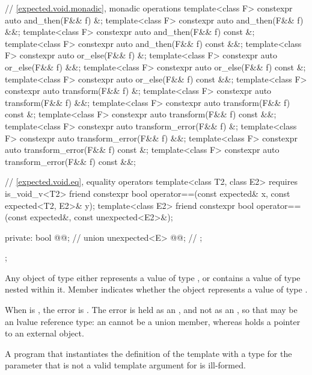 \begin{codeblock}
{  // \ref{expected.void.monadic}, monadic operations
  template<class F> constexpr auto and_then(F&& f) &;
  template<class F> constexpr auto and_then(F&& f) &&;
  template<class F> constexpr auto and_then(F&& f) const &;
  template<class F> constexpr auto and_then(F&& f) const &&;
  template<class F> constexpr auto or_else(F&& f) &;
  template<class F> constexpr auto or_else(F&& f) &&;
  template<class F> constexpr auto or_else(F&& f) const &;
  template<class F> constexpr auto or_else(F&& f) const &&;
  template<class F> constexpr auto transform(F&& f) &;
  template<class F> constexpr auto transform(F&& f) &&;
  template<class F> constexpr auto transform(F&& f) const &;
  template<class F> constexpr auto transform(F&& f) const &&;
  template<class F> constexpr auto transform_error(F&& f) &;
  template<class F> constexpr auto transform_error(F&& f) &&;
  template<class F> constexpr auto transform_error(F&& f) const &;
  template<class F> constexpr auto transform_error(F&& f) const &&;

  // \ref{expected.void.eq}, equality operators
  template<class T2, class E2> requires is_void_v<T2>
    friend constexpr bool operator==(const expected& x, const expected<T2, E2>& y);
  template<class E2>
    friend constexpr bool operator==(const expected&, const unexpected<E2>&);

private:
  bool @@;         // \expos
  union {
    unexpected<E> @@; // \expos
  };
};
\end{codeblock}

\pnum
Any object of type  either
represents a value of type , or
contains a value of type 
nested within it.
Member  indicates whether the  object
represents a value of type .

\begin{addedblock}
\pnum
When  is , the error is
. The error is held as an ,
and not as an , so that  may be an lvalue reference type: an
 cannot be a union member, whereas  holds a
pointer to an external object.
\end{addedblock}

\pnum
A program that instantiates
the definition of the template  with
a type for the  parameter that
is not a valid template argument for  is ill-formed.

